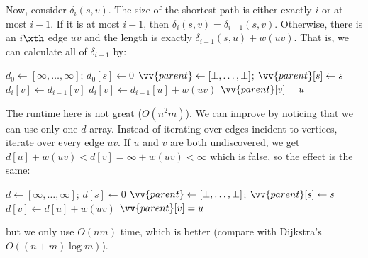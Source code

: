 Now, consider $\delta_i(s,v)$.
The size of the shortest path is either exactly $i$ or at most $i-1$.
If it is at most $i-1$, then $\delta_i(s,v) = \delta_{i-1}(s,v)$.
Otherwise, there is an $i\xth$ edge $uv$ and the length is
exactly $\delta_{i-1}(s,u) + w(uv)$.
That is, we can calculate all of $\delta_{i-1}$ by:
\begin{algorithm}[H]
  \caption{}
  \begin{algorithmic}[1]
    \State $d_0 \gets [\infty,\dotsc,\infty]$; $d_0[s] \gets 0$
    \State $\vv{parent} \gets [\bot,\dotsc,\bot]$; $\vv{parent}[s] \gets s$
        \State $d_i[v] \gets d_{i-1}[v]$
            \State $d_i[v] \gets d_{i-1}[u] + w(uv)$
            \State $\vv{parent}[v] = u$
          \EndIf
        \EndFor
      \EndFor
    \EndFor
  \end{algorithmic}
\end{algorithm}
The runtime here is not great ($O(n^2m)$).
We can improve by noticing that we can use only one $d$ array.
Instead of iterating over edges incident to vertices, iterate over every edge $uv$.
If $u$ and $v$ are both undiscovered,
we get $d[u] + w(uv) < d[v] = \infty + w(uv) < \infty$ which is false,
so the effect is the same:
\begin{algorithm}[H]
  \caption{}
  \begin{algorithmic}[1]
    \State $d \gets [\infty,\dotsc,\infty]$; $d[s] \gets 0$
    \State $\vv{parent} \gets [\bot,\dotsc,\bot]$; $\vv{parent}[s] \gets s$
          \State $d[v] \gets d[u] + w(uv)$
          \State $\vv{parent}[v] = u$
        \EndIf
      \EndFor
    \EndFor
  \end{algorithmic}
\end{algorithm}
but we only use $O(nm)$ time, which is better (compare with Dijkstra's $O((n+m)\log m)$).

